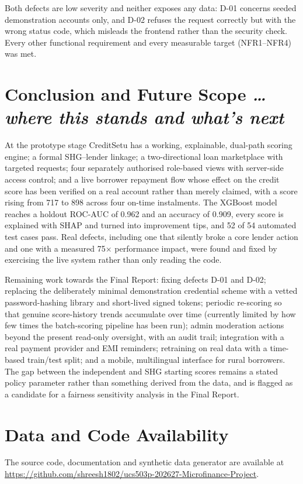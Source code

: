 \documentclass[11pt,a4paper]{article}
\newcommand{\BvrHint}[1]{%
  {\normalfont\normalsize\itshape\hfill #1}}
\begin{document}
Both defects are low severity and neither exposes any data: D-01 concerns
seeded demonstration accounts only, and D-02 refuses the request correctly
but with the wrong status code, which misleads the frontend rather than the
security check. Every other functional requirement and every measurable
target (NFR1--NFR4) was met.

\section{Conclusion and Future Scope%
\BvrHint{\ldots where this stands and what's next}}
\label{sec:concl}

At the prototype stage CreditSetu has a working, explainable, dual-path
scoring engine; a formal SHG--lender linkage; a two-directional loan
marketplace with targeted requests; four separately authorised role-based
views with server-side access control; and a live borrower repayment flow
whose effect on the credit score has been verified on a real account rather
than merely claimed, with a score rising from 717 to 898 across four
on-time instalments. The XGBoost model reaches a holdout ROC-AUC of 0.962
and an accuracy of 0.909, every score is explained with SHAP and turned
into improvement tips, and 52 of 54 automated test cases pass. Real
defects, including one that silently broke a core lender action and one
with a measured 75$\times$ performance impact, were found and fixed by
exercising the live system rather than only reading the code.

Remaining work towards the Final Report: fixing defects D-01 and D-02;
replacing the deliberately minimal demonstration credential scheme with a
vetted password-hashing library and short-lived signed tokens; periodic
re-scoring so that genuine score-history trends accumulate over time
(currently limited by how few times the batch-scoring pipeline has been
run); admin moderation actions beyond the present read-only oversight, with
an audit trail; integration with a real payment provider and EMI reminders;
retraining on real data with a time-based train/test split; and a mobile,
multilingual interface for rural borrowers. The gap between the independent
and SHG starting scores remains a stated policy parameter rather than
something derived from the data, and is flagged as a candidate for a
fairness sensitivity analysis in the Final Report.

\section*{Data and Code Availability}
The source code, documentation and synthetic data generator are available
at \url{https://github.com/shreesh1802/ucs503p-202627-Microfinance-Project}.
\end{document}
